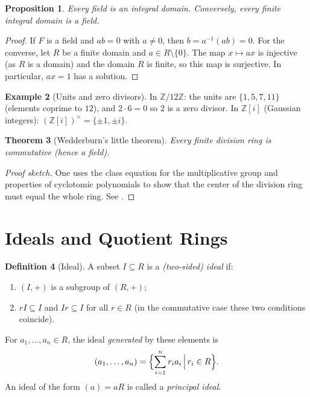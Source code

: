 \documentclass[12pt,a4paper]{amsart}
\newtheorem{theorem}{Theorem}[section]
\newtheorem{proposition}[theorem]{Proposition}
\theoremstyle{definition}
\newtheorem{definition}[theorem]{Definition}
\newtheorem{example}[theorem]{Example}
\theoremstyle{definition}
\begin{document}
\begin{proposition}\label{prop:field-domain}
Every field is an integral domain. Conversely, every finite integral domain is a field.
\end{proposition}

\begin{proof}
If $F$ is a field and $ab = 0$ with $a \neq 0$, then $b = a^{-1}(ab) = 0$.
For the converse, let $R$ be a finite domain and $a \in R \setminus \{0\}$.
The map $x \mapsto ax$ is injective (as $R$ is a domain) and the domain $R$ is
finite, so this map is surjective. In particular, $ax = 1$ has a solution.
\end{proof}

\begin{example}[Units and zero divisors]
In $\mathbb{Z}/12\mathbb{Z}$: the units are $\{1,5,7,11\}$ (elements coprime to
$12$), and $2 \cdot 6 = 0$ so $2$ is a zero divisor.
In $\mathbb{Z}[i]$ (Gaussian integers): $(\mathbb{Z}[i])^\times = \{\pm 1, \pm i\}$.
\end{example}

\begin{theorem}[Wedderburn's little theorem]
Every finite division ring is commutative (hence a field).
\end{theorem}

\begin{proof}[Proof sketch]
One uses the class equation for the multiplicative group and properties of
cyclotomic polynomials to show that the center of the division ring must
equal the whole ring. See \cite[Thm.~13.1]{Lang2002}.
\end{proof}

\section{Ideals and Quotient Rings}

\begin{definition}[Ideal]
A subset $I \subseteq R$ is a \emph{(two-sided) ideal} if:
\begin{enumerate}[label=(\roman*)]
  \item $(I,+)$ is a subgroup of $(R,+)$;
  \item $rI \subseteq I$ and $Ir \subseteq I$ for all $r \in R$
        (in the commutative case these two conditions coincide).
\end{enumerate}
For $a_1,\ldots,a_n \in R$, the ideal \emph{generated} by these elements is
\[
  (a_1,\ldots,a_n) = \Bigl\{\sum_{i=1}^{n} r_i a_i \,\Big|\, r_i \in R\Bigr\}.
\]
An ideal of the form $(a) = aR$ is called a \emph{principal ideal}.
\end{definition}
\end{document}
